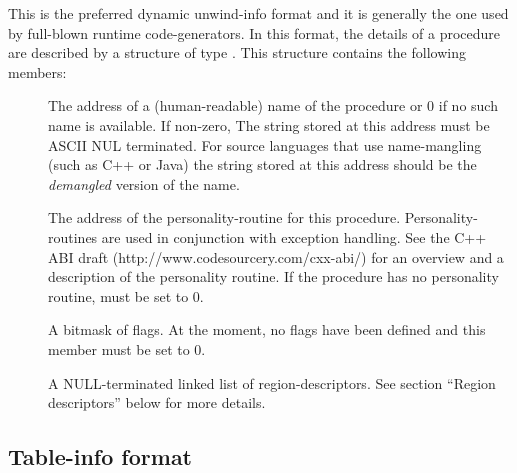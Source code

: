 \documentclass{article}
\begin{document}
This is the preferred dynamic unwind-info format and it is generally
the one used by full-blown runtime code-generators.  In this format,
the details of a procedure are described by a structure of type
.  This structure contains the following
members:
\begin{description}

\item[ ] The address of a
  (human-readable) name of the procedure or 0 if no such name is
  available.  If non-zero, The string stored at this address must be
  ASCII NUL terminated.  For source languages that use name-mangling
  (such as C++ or Java) the string stored at this address should be
  the \emph{demangled} version of the name.

\item[ ] The address of the
  personality-routine for this procedure.  Personality-routines are
  used in conjunction with exception handling.  See the C++ ABI draft
  (http://www.codesourcery.com/cxx-abi/) for an overview and a
  description of the personality routine.  If the procedure has no
  personality routine,  must be set to 0.

\item[ ] A bitmask of flags.  At the
  moment, no flags have been defined and this member must be
  set to 0.

\item[] A NULL-terminated
  linked list of region-descriptors.  See section ``Region
  descriptors'' below for more details.

\end{description}

\subsection{Table-info format}
\end{document}
